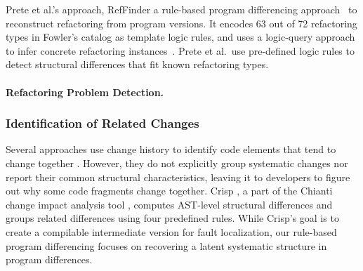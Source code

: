 \documentclass[runningheads,a4paper]{llncs}
\begin{document}
Prete et al.'s approach, RefFinder a rule-based program differencing approach~\cite{Prete2010:reffinder} to reconstruct refactoring from program versions. It encodes 63 out of 72 refactoring types in Fowler's catalog as template logic rules, and uses a logic-query approach to infer concrete refactoring instances~\cite{Prete2010:reffinder}. Prete et al.~use pre-defined logic rules to detect structural differences that fit known refactoring types. 



\paragraph{Refactoring Problem Detection.} 


\subsubsection{Identification of Related Changes} 
Several approaches use change history to identify code elements that tend to change together \cite{Gall1998, Ying2004, Zimmermann2004}.  However, they do not explicitly group systematic changes nor report their common structural characteristics, leaving it to developers to figure out why some code fragments change together.  Crisp \cite{Chesley2005}, a part of the Chianti change impact analysis tool \cite{Ren2004}, computes AST-level structural differences and groups related differences using four predefined rules. While Crisp's goal is to create a compilable intermediate version for fault localization, our rule-based program differencing focuses on recovering a latent systematic structure in program differences. 
\end{document}
